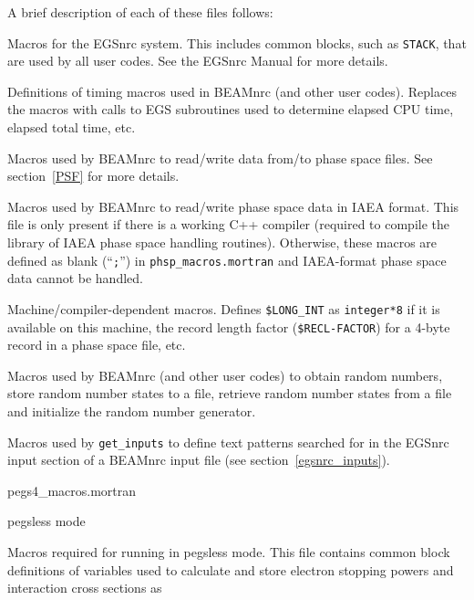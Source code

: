 \documentclass[12pt,twoside]{article}
\begin{document}
A brief description of each of these files follows:
\begin{description}
\item [{\tt egsnrc.macros}]  Macros for the EGSnrc system.  This
includes common blocks, such as {\tt STACK}, that are used by
all user codes.  See the EGSnrc Manual\cite{KR03} for more details.
\item [{\tt timing.macros}] Definitions of timing macros used in
BEAMnrc (and other user codes).  Replaces the macros with calls to
EGS subroutines used to determine elapsed CPU time, elapsed total
time, etc.
\item[{\tt phsp\_macros.mortran}] Macros used by BEAMnrc to
read/write data from/to phase space files.  See section~\ref{PSF} for
more details.
\item[{\tt iaea\_phsp\_macros.mortran}] Macros used by BEAMnrc to
read/write phase space data in IAEA format.  This file is only present
if there is a working C++ compiler (required to compile the library of
IAEA phase space handling routines).  Otherwise, these macros are defined
as blank (``{\tt ;}'') in {\tt phsp\_macros.mortran} and IAEA-format phase
space data cannot be handled.
\item [{\tt machine.macros}] Machine/compiler-dependent macros.
Defines {\tt \$LONG\_INT} as {\tt integer*8} if it is available
on this machine, the record length factor ({\tt \$RECL-FACTOR}) for
a 4-byte record in a phase space file, etc.
\item [{\tt ranmar.macros} (or {\tt ranlux.macros})] Macros used by
BEAMnrc (and other user codes) to obtain random numbers, store random
number states to a file, retrieve random number states from a file and
initialize the random number generator.
\item [{\tt transportp.macros}] Macros used by {\tt get\_inputs} to
define text patterns searched for in the EGSnrc input section of
a BEAMnrc input file (see section~\ref{egsnrc_inputs}).
\item{pegs4\_macros.mortran}
\item{pegsless mode}
\item [{\tt pegs4\_macros.mortran}] Macros required for running in pegsless
mode.  This file contains common block definitions of variables used to
calculate and store electron stopping powers and interaction cross sections as

\end{description}
\end{document}
